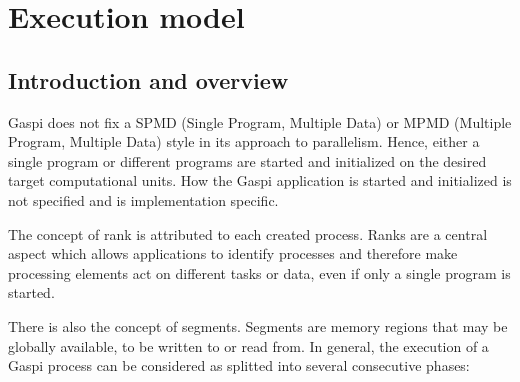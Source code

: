 \documentclass[a4paper]{article}
\newlength{\st}\setlength{\st}{0pt}
\newcommand{\GASPI}{{\sc Gaspi}}
\begin{document}
\section{Execution model}

\subsection{Introduction and overview}
\label{SubSec:ExecPhases}

\GASPI{} does not fix a SPMD (Single Program, Multiple Data) or MPMD
(Multiple Program, Multiple Data) style in its approach to
parallelism.  Hence, either a single program or different programs are
started and initialized on the desired target computational units. How
the \GASPI{} application is started and initialized is not specified
and is implementation specific.

The concept of rank is attributed to each created process. Ranks are a
central aspect which allows applications to identify processes and
therefore make processing elements act on different tasks or data,
even if only a single program is started.

There is also the concept of segments. Segments are memory regions
that may be globally available, to be written to or read from. In general,
the execution of a \GASPI{} process can be considered as splitted
into several consecutive phases:
\end{document}

